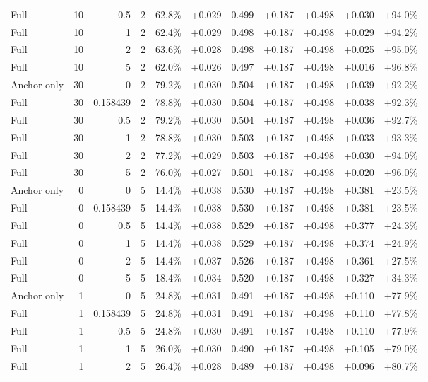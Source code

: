 \begin{table}[htbp]
\begin{tabular}{lrrrccccccc}
Full & 10 & 0.5 & 2 & 62.8\% & +0.029 & 0.499 & +0.187 & +0.498 & +0.030 & +94.0\% \\
Full & 10 & 1 & 2 & 62.4\% & +0.029 & 0.498 & +0.187 & +0.498 & +0.029 & +94.2\% \\
Full & 10 & 2 & 2 & 63.6\% & +0.028 & 0.498 & +0.187 & +0.498 & +0.025 & +95.0\% \\
Full & 10 & 5 & 2 & 62.0\% & +0.026 & 0.497 & +0.187 & +0.498 & +0.016 & +96.8\% \\
Anchor only & 30 & 0 & 2 & 79.2\% & +0.030 & 0.504 & +0.187 & +0.498 & +0.039 & +92.2\% \\
Full & 30 & 0.158439 & 2 & 78.8\% & +0.030 & 0.504 & +0.187 & +0.498 & +0.038 & +92.3\% \\
Full & 30 & 0.5 & 2 & 79.2\% & +0.030 & 0.504 & +0.187 & +0.498 & +0.036 & +92.7\% \\
Full & 30 & 1 & 2 & 78.8\% & +0.030 & 0.503 & +0.187 & +0.498 & +0.033 & +93.3\% \\
Full & 30 & 2 & 2 & 77.2\% & +0.029 & 0.503 & +0.187 & +0.498 & +0.030 & +94.0\% \\
Full & 30 & 5 & 2 & 76.0\% & +0.027 & 0.501 & +0.187 & +0.498 & +0.020 & +96.0\% \\
Anchor only & 0 & 0 & 5 & 14.4\% & +0.038 & 0.530 & +0.187 & +0.498 & +0.381 & +23.5\% \\
Full & 0 & 0.158439 & 5 & 14.4\% & +0.038 & 0.530 & +0.187 & +0.498 & +0.381 & +23.5\% \\
Full & 0 & 0.5 & 5 & 14.4\% & +0.038 & 0.529 & +0.187 & +0.498 & +0.377 & +24.3\% \\
Full & 0 & 1 & 5 & 14.4\% & +0.038 & 0.529 & +0.187 & +0.498 & +0.374 & +24.9\% \\
Full & 0 & 2 & 5 & 14.4\% & +0.037 & 0.526 & +0.187 & +0.498 & +0.361 & +27.5\% \\
Full & 0 & 5 & 5 & 18.4\% & +0.034 & 0.520 & +0.187 & +0.498 & +0.327 & +34.3\% \\
Anchor only & 1 & 0 & 5 & 24.8\% & +0.031 & 0.491 & +0.187 & +0.498 & +0.110 & +77.9\% \\
Full & 1 & 0.158439 & 5 & 24.8\% & +0.031 & 0.491 & +0.187 & +0.498 & +0.110 & +77.8\% \\
Full & 1 & 0.5 & 5 & 24.8\% & +0.030 & 0.491 & +0.187 & +0.498 & +0.110 & +77.9\% \\
Full & 1 & 1 & 5 & 26.0\% & +0.030 & 0.490 & +0.187 & +0.498 & +0.105 & +79.0\% \\
Full & 1 & 2 & 5 & 26.4\% & +0.028 & 0.489 & +0.187 & +0.498 & +0.096 & +80.7\% \\

\end{tabular}
\end{table}
